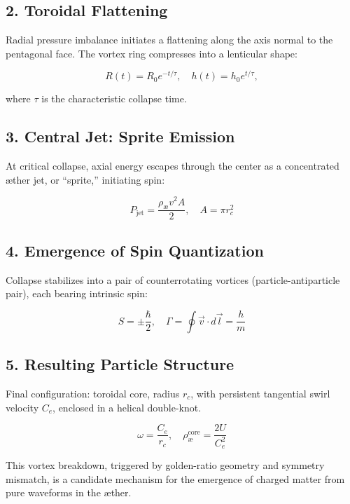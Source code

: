 \documentclass[11pt]{article}
\begin{document}
\subsection*{2. Toroidal Flattening}
Radial pressure imbalance initiates a flattening along the axis normal to the pentagonal face. The vortex ring compresses into a lenticular shape:

\begin{equation}
    R(t) = R_0 e^{-t/\tau}, \quad h(t) = h_0 e^{t/\tau},
\end{equation}

where $\tau$ is the characteristic collapse time.

\subsection*{3. Central Jet: Sprite Emission}
At critical collapse, axial energy escapes through the center as a concentrated æther jet, or ``sprite,'' initiating spin:

\begin{equation}
    P_\text{jet} = \frac{\rho_\text{\ae} v^2 A}{2}, \quad A = \pi r_c^2
\end{equation}

\subsection*{4. Emergence of Spin Quantization}
Collapse stabilizes into a pair of counterrotating vortices (particle-antiparticle pair), each bearing intrinsic spin:

\begin{equation}
    S = \pm \frac{\hbar}{2}, \quad \Gamma = \oint \vec{v} \cdot d\vec{l} = \frac{h}{m}
\end{equation}

\subsection*{5. Resulting Particle Structure}
Final configuration: toroidal core, radius $r_c$, with persistent tangential swirl velocity $C_e$, enclosed in a helical double-knot.

\begin{equation}
    \omega = \frac{C_e}{r_c}, \quad \rho_\text{\ae}^{\text{core}} = \frac{2 U}{C_e^2}
\end{equation}

This vortex breakdown, triggered by golden-ratio geometry and symmetry mismatch, is a candidate mechanism for the emergence of charged matter from pure waveforms in the æther.
\end{document}
